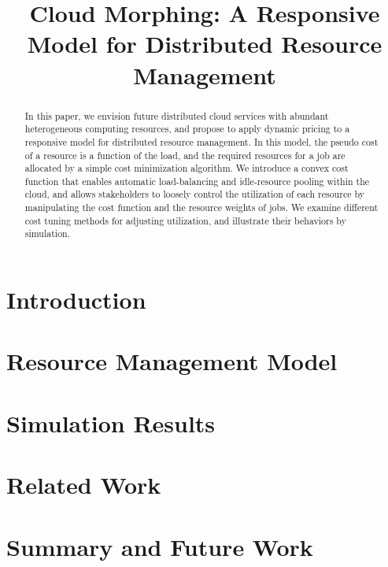 \documentclass[10pt,sigconf,letterpaper,anonymous,nonacm]{acmart}
\title{Cloud Morphing: A Responsive Model for Distributed Resource Management}
\begin{document}
\begin{abstract}

    In this paper, we envision future distributed cloud services with
    abundant heterogeneous computing resources,
    and propose to apply dynamic pricing to a responsive model for
    distributed resource management.
    In this model, the pseudo cost of a resource is a function of the
    load, and the required resources for a job are allocated by a simple
    cost minimization algorithm.
    We introduce a convex cost function that enables automatic
    load-balancing and idle-resource pooling within the cloud, and allows
    stakeholders to loosely control the utilization of each resource by
    manipulating the cost function and the resource weights of jobs.
    We examine different cost tuning methods for adjusting
    utilization, and illustrate their behaviors by simulation.

\end{abstract}

\maketitle

\section{Introduction}



\section{Resource Management Model}



\section{Simulation Results}



\section{Related Work}



\section{Summary and Future Work}





\end{document}
